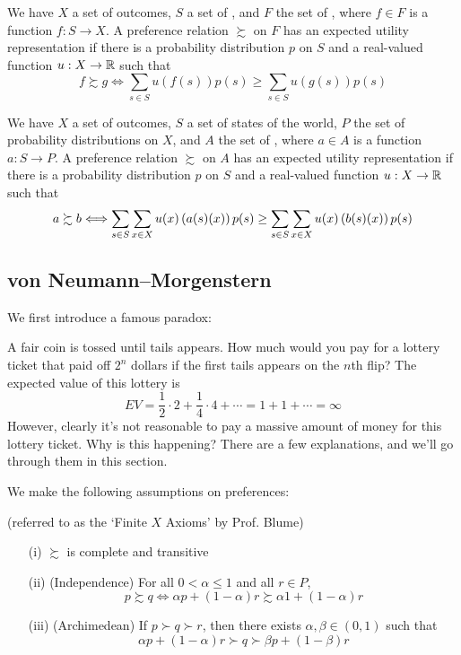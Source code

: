 \documentclass[12pt]{article}
\begin{document}
\begin{model}
	 We have $X$ a set of outcomes, $S$ a set of , and $F$ the set of , where $f \in F$ is a function $f : S \to X$. A preference relation $\succsim$ on $F$ has an expected utility representation if there is a probability distribution $p$ on $S$ and a real-valued function $u: X \to \mathbb{R}$ such that
	\[
	f \succsim g \Longleftrightarrow \sum_{s \in S} u(f(s))p(s) \ge \sum_{s \in S} u(g(s))p(s)
	\]
\end{model}

\begin{model}
	 We have $X$ a set of outcomes, $S$ a set of states of the world, $P$ the set of probability distributions on $X$, and $A$ the set of , where $a \in A$ is a function $a: S \to P$. A preference relation $\succsim$ on $A$ has an expected utility representation if there is a probability distribution $p$ on $S$ and a real-valued function $u: X \to \mathbb{R}$ such that
	\[
	a \succsim b \Longleftrightarrow \sum_{s \in S} \sum_{x \in X} u(x) \left( a(s) (x)\right) p(s) \ge \sum_{s \in S} \sum_{x \in X} u(x) \left( b(s) (x)\right) p(s)
	\]
\end{model}

\subsection{von Neumann--Morgenstern}

We first introduce a famous paradox:

\begin{example}
	 A fair coin is tossed until tails appears. How much would you pay for a lottery ticket that paid off $2^n$ dollars if the first tails appears on the $n$th flip? The expected value of this lottery is
	\[
	EV = \frac{1}{2} \cdot 2 + \frac{1}{4}\cdot 4 + \cdots = 1 + 1 + \cdots = \infty
	\]
	However, clearly it's not reasonable to pay a massive amount of money for this lottery ticket. Why is this happening? There are a few explanations, and we'll go through them in this section.
\end{example}

We make the following assumptions on preferences:

\begin{assumption}\label{ass:vnm}
(referred to as the `Finite $X$ Axioms' by Prof. Blume)
	\begin{itemize}
		\item[(i)] $\succsim$ is complete and transitive
		\item[(ii)] (Independence) For all $0 < \alpha \le 1$ and all $r \in P$,
		\[
		p \succsim q \Longleftrightarrow \alpha p + (1-\alpha)r \succsim \alpha 1 + (1-\alpha)r
		\]
		\item[(iii)] (Archimedean) If $p \succ q \succ r$, then there exists $\alpha,\beta \in (0,1)$ such that
		\[
		\alpha p + (1-\alpha) r \succ q \succ \beta p + (1-\beta)r
		\]
	\end{itemize}
\end{assumption}
\end{document}

